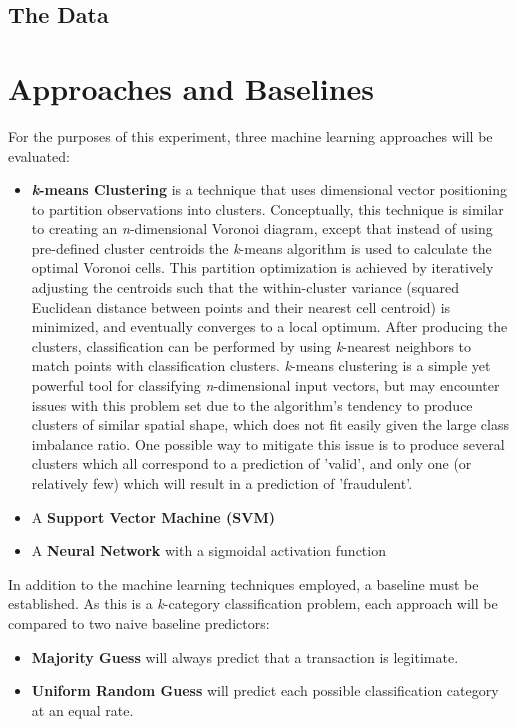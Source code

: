 \documentclass[10pt,conference]{IEEEtran}
\begin{document}
  \subsection{The Data}

\section{Approaches and Baselines}
  For the purposes of this experiment, three machine learning approaches will be evaluated:
  \begin{itemize}
    \item \textbf{\emph{k}-means Clustering} is a technique that uses dimensional vector positioning to partition observations into clusters. Conceptually, this technique is similar to creating an \emph{n}-dimensional Voronoi diagram, except that instead of using pre-defined cluster centroids the \emph{k}-means algorithm is used to calculate the optimal Voronoi cells. This partition optimization is achieved by iteratively adjusting the centroids such that the within-cluster variance (squared Euclidean distance between points and their nearest cell centroid) is minimized, and eventually converges to a local optimum. After producing the clusters, classification can be performed by using \emph{k}-nearest neighbors to match points with classification clusters. \emph{k}-means clustering is a simple yet powerful tool for classifying \emph{n}-dimensional input vectors, but may encounter issues with this problem set due to the algorithm's tendency to produce clusters of similar spatial shape, which does not fit easily given the large class imbalance ratio. One possible way to mitigate this issue is to produce several clusters which all correspond to a prediction of 'valid', and only one (or relatively few) which will result in a prediction of 'fraudulent'.
    \item A \textbf{Support Vector Machine (SVM)}
    \item A \textbf{Neural Network} with a sigmoidal activation function
  \end{itemize}
  In addition to the machine learning techniques employed, a baseline must be established. As this is a \emph{k}-category classification problem, each approach will be compared to two naive baseline predictors:
  \begin{itemize}
    \item \textbf{Majority Guess} will always predict that a transaction is legitimate.
    \item \textbf{Uniform Random Guess} will predict each possible classification category at an equal rate.
  \end{itemize}
\end{document}
